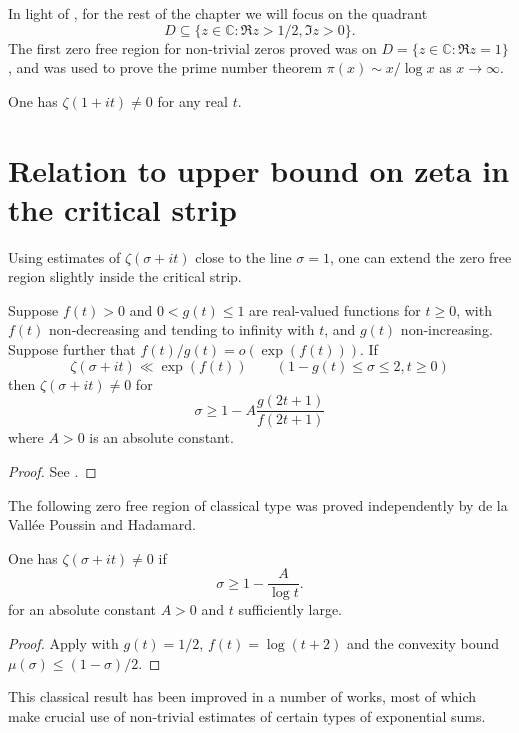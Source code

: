 In light of , for the rest of the chapter we will focus on the quadrant 
\[
D\subseteq \{z \in \mathbb{C}: \Re z > 1/2, \Im z > 0\}.
\]
The first zero free region for non-trivial zeros proved was on $D = \{z \in \mathbb{C}: \Re z = 1\}$, and was used to prove the prime number theorem $\pi(x) \sim x/\log x$ as $x \to \infty$.

\begin{theorem}
One has $\zeta(1 + it) \ne 0$ for any real $t$.
\end{theorem}

\section{Relation to upper bound on zeta in the critical strip}

Using estimates of $\zeta(\sigma + it)$ close to the line $\sigma = 1$, one can extend the zero free region slightly inside the critical strip. 

\begin{lemma}\label{mu_to_zero_free}
Suppose $f(t) > 0$ and $0 < g(t) \le 1$ are real-valued functions for $t \ge 0$, with $f(t)$ non-decreasing and tending to infinity with $t$, and $g(t)$ non-increasing. Suppose further that $f(t)/g(t) = o(\exp(f(t)))$. If 
\[
\zeta(\sigma + it) \ll \exp(f(t))\qquad (1 - g(t) \le \sigma \le 2, t \ge 0)
\]
then $\zeta(\sigma + it) \ne 0$ for 
\[
\sigma \ge 1 - A\frac{g(2t + 1)}{f(2t + 1)}
\]
where $A > 0$ is an absolute constant. 
\end{lemma}
\begin{proof}
See \cite[Theorem 3.10]{titchmarsh_theory_1986}.
\end{proof}

The following zero free region of classical type was proved independently by de la Vall\'ee Poussin and Hadamard.

\begin{theorem}\label{zfr-classical}
One has $\zeta(\sigma + it) \ne 0$ if 
\[
\sigma \ge 1 - \frac{A}{\log t}.
\]
for an absolute constant $A > 0$ and $t$ sufficiently large.
\end{theorem}
\begin{proof}
Apply  with $g(t) = 1/2$, $f(t) = \log (t + 2)$ and the convexity bound $\mu(\sigma) \le (1-\sigma)/2$.
\end{proof}

This classical result has been improved in a number of works, most of which make crucial use of non-trivial estimates of certain types of exponential sums.

